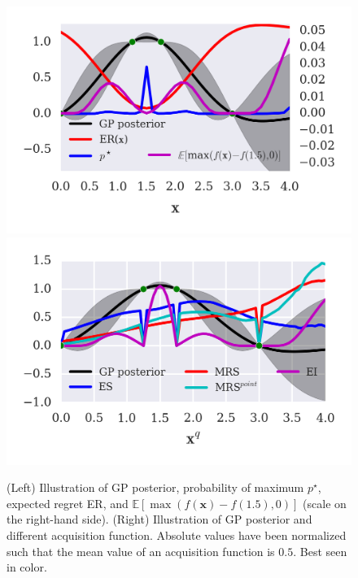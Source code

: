 \begin{block}{}
\vspace*{1cm}

\begin{figure}
\centering
\includegraphics[width=0.4\columnwidth]{../pics/regret_illustration}
\includegraphics[width=0.4\columnwidth]{../pics/acq_comparison}
\caption{(Left) Illustration of GP posterior, probability of maximum $p^\star$, expected regret ER, and  $\mathbb{E}[\max(f(\mathbf{x}) - f(1.5), 0)]$ (scale on the right-hand side). (Right) Illustration of GP posterior and different acquisition function. Absolute values have been normalized such that the mean value of an acquisition function is $0.5$. Best seen in color.}
\label{fig:MRS_illustration}
\end{figure}

\end{block}